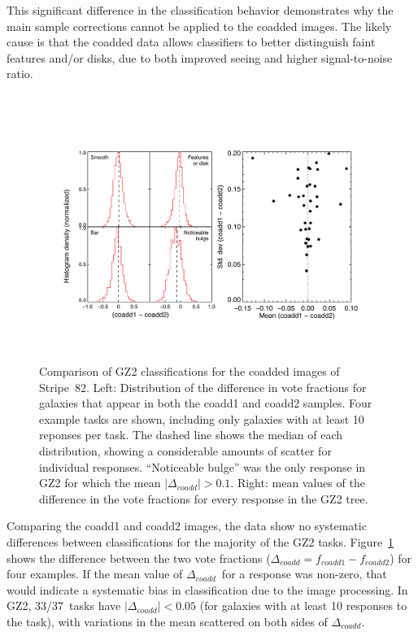 \documentclass[useAMS,usenatbib]{mn2e}
\newcommand{\dcoadd}{$\Delta_{coadd}$}
\begin{document}
This significant difference in the classification behavior demonstrates why the main sample corrections cannot be applied to the coadded images. The likely cause is that the coadded data allows classifiers to better distinguish faint features and/or disks, due to both improved seeing \citep[from $1.4\arcsec$ to $1.1\arcsec$;][]{ann11} and higher signal-to-noise ratio.

\begin{figure}
\includegraphics[angle=0,width=7.0in]{figures/stripe82_coadd_compare.pdf}
\caption{Comparison of GZ2 classifications for the coadded images of Stripe~82. Left: Distribution of the difference in vote fractions for galaxies that appear in both the coadd1 and coadd2 samples. Four example tasks are shown, including only galaxies with at least 10 reponses per task. The dashed line shows the median of each distribution, showing a considerable amounts of scatter for individual responses. ``Noticeable bulge'' was the only response in GZ2 for which the mean $|\Delta_{coadd}| > 0.1$. Right: mean values of the difference in the vote fractions for every response in the GZ2 tree. 
\label{fig-stripe82_compare}}
\end{figure}

Comparing the coadd1 and coadd2 images, the data show no systematic differences between classifications for the majority of the GZ2 tasks. Figure~\ref{fig-stripe82_compare} shows the difference between the two vote fractions ($\Delta_{coadd} = f_{coadd1} - f_{coadd2}$) for four examples. If the mean value of \dcoadd~for a response was non-zero, that would indicate a systematic bias in classification due to the image processing. In GZ2, 33/37~tasks have $|\Delta_{coadd}| < 0.05$ (for galaxies with at least 10 responses to the task), with variations in the mean scattered on both sides of \dcoadd. 
\end{document}
